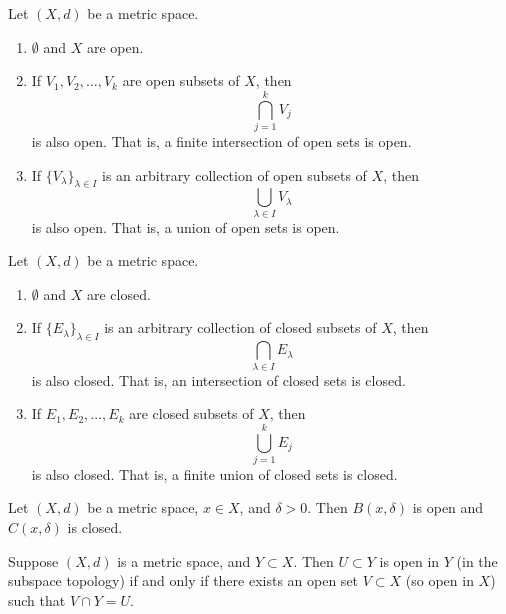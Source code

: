 \documentclass[../main.tex]{subfiles}
\begin{document}
    \begin{proposition} \label{prop:open_sets}
    Let \( (X, d) \) be a metric space.
    \begin{enumerate}
        \item \( \emptyset \) and \( X \) are open.
        \item If \( V_1, V_2, \dots, V_k \) are open subsets of \( X \), then
        \[
        \bigcap_{j=1}^{k} V_j
        \]
        is also open. That is, a finite intersection of open sets is open.
        \item If \( \{ V_{\lambda} \}_{\lambda \in I} \) is an arbitrary collection of open subsets of \( X \), then
        \[
        \bigcup_{\lambda \in I} V_{\lambda}
        \]
        is also open. That is, a union of open sets is open.
    \end{enumerate}
    \end{proposition}
    
    \begin{proposition} \label{prop:closed_sets}
    Let \( (X, d) \) be a metric space.
    \begin{enumerate}
        \item \( \emptyset \) and \( X \) are closed.
        \item If \( \{ E_{\lambda} \}_{\lambda \in I} \) is an arbitrary collection of closed subsets of \( X \), then
        \[
        \bigcap_{\lambda \in I} E_{\lambda}
        \]
        is also closed. That is, an intersection of closed sets is closed.
        \item If \( E_1, E_2, \dots, E_k \) are closed subsets of \( X \), then
        \[
        \bigcup_{j=1}^{k} E_j
        \]
        is also closed. That is, a finite union of closed sets is closed.
    \end{enumerate}
    \end{proposition}
    
    \begin{proposition} \label{prop:open_closed_ball}
    Let \( (X, d) \) be a metric space, \( x \in X \), and \( \delta > 0 \). Then \( B(x, \delta) \) is open and \( C(x, \delta) \) is closed.
    \end{proposition}
    
    \begin{proposition} \label{prop:subspace_topology}
    Suppose \( (X, d) \) is a metric space, and \( Y \subset X \). Then \( U \subset Y \) is open in \( Y \) (in the subspace topology) if and only if there exists an open set \( V \subset X \) (so open in \( X \)) such that \( V \cap Y = U \).
    \end{proposition}
    
\end{document}
